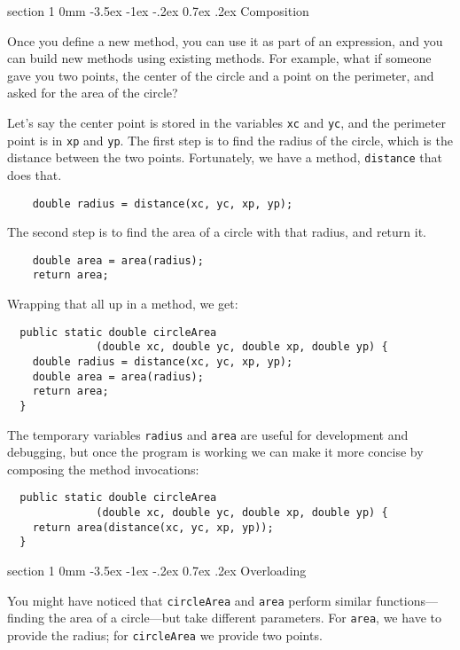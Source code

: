 \documentclass{book}
\makeatletter
\renewcommand{\section}{\@startsection 
    {section} {1} {0mm}%
    {-3.5ex \@plus -1ex \@minus -.2ex}%
    {0.7ex \@plus.2ex}%
    {\normalfont\Large\bfseries}}
\makeatother
\begin{document}
\section{Composition}

Once you define a new method,
you can use it as part of an expression, and you can build
new methods using existing methods.  For example, what if someone
gave you two points, the center of the circle and a point on
the perimeter, and asked for the area of the circle?

Let's say the center point is stored in the variables {\tt xc}
and {\tt yc}, and the perimeter point is in {\tt xp} and
{\tt yp}.  The first step is to find the radius of the circle, which
is the distance between the two points.  Fortunately, we have
a method, {\tt distance} that does that.

\begin{verbatim}
    double radius = distance(xc, yc, xp, yp);
\end{verbatim}
%
The second step is to find the area of a circle with that
radius, and return it.

\begin{verbatim}
    double area = area(radius);
    return area;
\end{verbatim}
%
Wrapping that all up in a method, we get:

\begin{verbatim}
  public static double circleArea
              (double xc, double yc, double xp, double yp) {
    double radius = distance(xc, yc, xp, yp);
    double area = area(radius);
    return area;
  } 
\end{verbatim}
%
The temporary variables {\tt radius} and {\tt area} are
useful for development and debugging, but once the program is
working we can make it more concise by composing
the method invocations:

\begin{verbatim}
  public static double circleArea
              (double xc, double yc, double xp, double yp) {
    return area(distance(xc, yc, xp, yp));
  } 
\end{verbatim}


\section{Overloading}
\label{overloading}

You might have noticed that {\tt circleArea}
and {\tt area} perform similar functions---finding
the area of a circle---but take different parameters.  For
{\tt area}, we have to provide the radius; for {\tt circleArea}
we provide two points.
\end{document}
